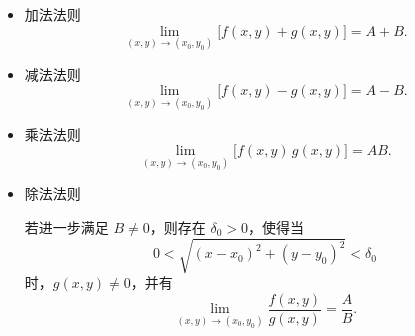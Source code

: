 \documentclass{article}
\begin{document}
\begin{itemize}
  \item 加法法则
        \[
          \lim_{(x,y)\to(x_0,y_0)}\bigl[f(x,y)+g(x,y)\bigr]
          =
          A+B.
        \]
  \item 减法法则
        \[
          \lim_{(x,y)\to(x_0,y_0)}\bigl[f(x,y)-g(x,y)\bigr]
          =
          A-B.
        \]
  \item 乘法法则
        \[
          \lim_{(x,y)\to(x_0,y_0)}\bigl[f(x,y)\,g(x,y)\bigr]
          =
          AB.
        \]
  \item 除法法则
  
        若进一步满足 $B\neq 0$，则存在 $\delta_0>0$，使得当
        \[
          0<\sqrt{(x-x_0)^2+(y-y_0)^2}<\delta_0
        \]
        时，$g(x,y)\neq 0$，并有
        \[
          \lim_{(x,y)\to(x_0,y_0)}\frac{f(x,y)}{g(x,y)}
          =
          \frac{A}{B}.
        \]
\end{itemize}
\end{document}
